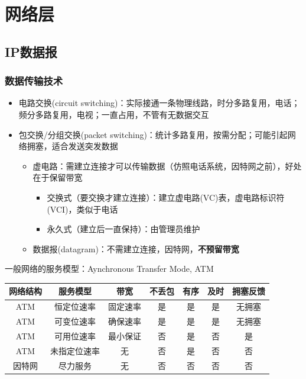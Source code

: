 
\section{网络层}
\subsection{IP数据报}
\subsubsection{数据传输技术}
\begin{itemize}
\item 电路交换(circuit switching)：实际接通一条物理线路，时分多路复用，电话；频分多路复用，电视；一直占用，不管有无数据交互
\item 包交换/分组交换(packet switching)：统计多路复用，按需分配；可能引起网络拥塞，适合发送突发数据
\begin{itemize}
	\item 虚电路：需建立连接才可以传输数据（仿照电话系统，因特网之前），好处在于保留带宽
	\begin{itemize}
	    \item 交换式（要交换才建立连接）：建立虚电路(VC)表，虚电路标识符(VCI)，类似于电话
	    \item 永久式（建立后一直保持）：由管理员维护
	\end{itemize}
	\item 数据报(datagram)：不需建立连接，因特网，\textbf{不预留带宽}
\end{itemize}
\end{itemize}

一般网络的服务模型：Aynchronous Transfer Mode, ATM
\begin{center}
\begin{tabular}{|c|c|c|c|c|c|c|}\hline
网络结构 & 服务模型 & 带宽 & 不丢包 & 有序 & 及时 & 拥塞反馈\\\hline
ATM & 恒定位速率 & 固定速率 & 是 & 是 & 是 & 无拥塞\\\hline
ATM & 可变位速率 & 确保速率 & 是 & 是 & 是 & 无拥塞\\\hline
ATM & 可用位速率 & 最小保证 & 否 & 是 & 否 & 是\\\hline
ATM & 未指定位速率 & 无 & 否 & 是 & 否 & 否\\\hline
因特网 & 尽力服务 & 无 & 否 & 否 & 否 & 否\\\hline
\end{tabular}
\end{center}

